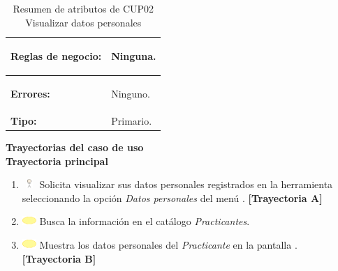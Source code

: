 \begin{table}[H]
\begin{tabular}{| l | p{12 cm} |}
\hline
\textbf{Reglas de negocio:} & \vspace{-2mm}	%
							\begin{compactitem}
								\item Ninguna.
							\end{compactitem}\\							
\hline
\textbf{Errores:} &	\vspace{-2mm}	%
							\begin{compactitem}
								\item Ninguno.
							\end{compactitem}\\
\hline
\textbf{Tipo:} & Primario.\\
\hline	
\end{tabular}
\caption{Resumen de atributos de CUP02 Visualizar datos personales}
\label{tab:CUP02}
\end{table} 

\textbf{\textcolor[rgb]{0, 0, 0.545098}{Trayectorias del caso de uso}} \\

\textbf{\large{Trayectoria principal}}

\begin{enumerate}
	\item \includegraphics[width=15pt, height=10pt]{./Figuras/iconosCU/usuario.png} Solicita visualizar sus datos personales registrados en la herramienta seleccionando la opción \textit{Datos personales} del menú . \textbf{[Trayectoria A]}
	\item \includegraphics[width=15pt]{./Figuras/iconosCU/herramienta.png} Busca la información en el catálogo \textit{Practicantes}.
	\item \includegraphics[width=15pt]{./Figuras/iconosCU/herramienta.png} Muestra  los datos personales del \textit{Practicante} en la pantalla . \textbf{[Trayectoria B]}
\end{enumerate}
	
